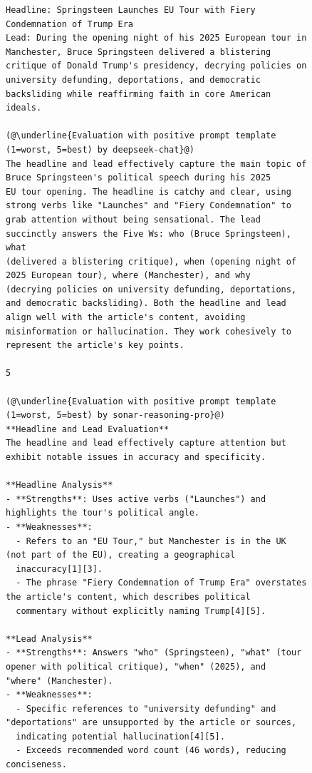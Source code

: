 \documentclass[UTF8,noindent,nohyp,parspace,titlepage,twoside,12pt]{article}
\begin{document}
    \begin{figure}[!hbtp]
      \begin{lstlisting}[basicstyle=\tiny\sffamily,frame=single,linewidth=\textwidth]
Headline: Springsteen Launches EU Tour with Fiery Condemnation of Trump Era
Lead: During the opening night of his 2025 European tour in Manchester, Bruce Springsteen delivered a blistering
critique of Donald Trump's presidency, decrying policies on university defunding, deportations, and democratic
backsliding while reaffirming faith in core American ideals.

(@\underline{Evaluation with positive prompt template (1=worst, 5=best) by deepseek-chat}@)
The headline and lead effectively capture the main topic of Bruce Springsteen's political speech during his 2025
EU tour opening. The headline is catchy and clear, using strong verbs like "Launches" and "Fiery Condemnation" to
grab attention without being sensational. The lead succinctly answers the Five Ws: who (Bruce Springsteen), what
(delivered a blistering critique), when (opening night of 2025 European tour), where (Manchester), and why
(decrying policies on university defunding, deportations, and democratic backsliding). Both the headline and lead
align well with the article's content, avoiding misinformation or hallucination. They work cohesively to
represent the article's key points.

5

(@\underline{Evaluation with positive prompt template (1=worst, 5=best) by sonar-reasoning-pro}@)
**Headline and Lead Evaluation**
The headline and lead effectively capture attention but exhibit notable issues in accuracy and specificity.

**Headline Analysis**
- **Strengths**: Uses active verbs ("Launches") and highlights the tour's political angle.
- **Weaknesses**:
  - Refers to an "EU Tour," but Manchester is in the UK (not part of the EU), creating a geographical
  inaccuracy[1][3].
  - The phrase "Fiery Condemnation of Trump Era" overstates the article's content, which describes political
  commentary without explicitly naming Trump[4][5].

**Lead Analysis**
- **Strengths**: Answers "who" (Springsteen), "what" (tour opener with political critique), "when" (2025), and
"where" (Manchester).
- **Weaknesses**:
  - Specific references to "university defunding" and "deportations" are unsupported by the article or sources,
  indicating potential hallucination[4][5].
  - Exceeds recommended word count (46 words), reducing conciseness.


\end{lstlisting}
\end{figure}
\end{document}
